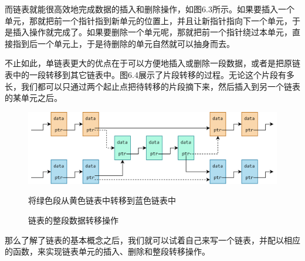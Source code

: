 而链表就能很高效地完成数据的插入和删除操作，如图6.3所示。如果要插入一个单元，那就把前一个指针指到新单元的位置上，并且让新指针指向下一个单元，于是插入操作就完成了。如果要删除一个单元呢，那就把前一个指针绕过本单元，直接指到后一个单元上，于是待删除的单元自然就可以抽身而去。\par
不止如此，单链表更大的优点在于可以方便地插入或删除一段数据，或者是把原链表中的一段转移到其它链表中。图6.4展示了片段转移的过程。无论这个片段有多长，我们都可以只通过两个起止点把待转移的片段摘下来，然后插入到另一个链表的某单元之后。\par
\begin{figure}[htbp]
    \centering
    \includegraphics[width=\textwidth]{../images/generalized_parts/06_advanced_operation_on_list_300.png}
    \caption{链表的整段数据转移操作}
    \footnotesize{将绿色段从黄色链表中转移到蓝色链表中}
\end{figure}
那么了解了链表的基本概念之后，我们就可以试着自己来写一个链表，并配以相应的函数，来实现链表单元的插入、删除和整段转移操作。\par
